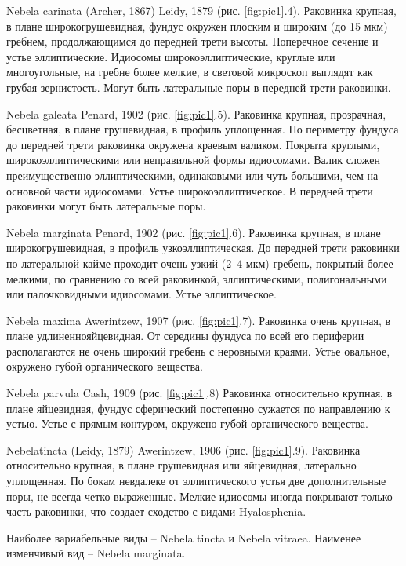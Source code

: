 \documentclass[12pt, a4paper]{article}
\begin{document}
Nebela carinata (Archer, 1867) Leidy, 1879 (рис. \ref{fig:pic1}.4). Раковинка крупная, в плане широкогрушевидная, фундус окружен плоским и широким (до 15 мкм) гребнем, продолжающимся до передней трети высоты. Поперечное сечение и устье эллиптические. Идиосомы широкоэллиптические, круглые или многоугольные, на гребне более мелкие, в световой микроскоп выглядят как грубая зернистость. Могут быть латеральные поры в передней трети раковинки. 

Nebela galeata Penard, 1902 (рис. \ref{fig:pic1}.5). Раковинка крупная, прозрачная, бесцветная, в плане грушевидная, в профиль уплощенная. По периметру фундуса до передней трети раковинка окружена краевым валиком. Покрыта круглыми, широкоэллиптическими или неправильной формы идиосомами. Валик сложен преимущественно эллиптическими, одинаковыми или чуть большими, чем на основной части идиосомами. Устье широкоэллиптическое. В передней трети раковинки могут быть латеральные поры.

Nebela marginata Penard, 1902 (рис. \ref{fig:pic1}.6). Раковинка крупная, в плане широкогрушевидная, в профиль узкоэллиптическая. До передней трети раковинки по латеральной кайме проходит очень узкий (2–4 мкм) гребень, покрытый более мелкими, по сравнению со всей раковинкой, эллиптическими, полигональными или палочковидными идиосомами. Устье эллиптическое. 

Nebela maxima Awerintzew, 1907 (рис. \ref{fig:pic1}.7). Раковинка очень крупная, в плане удлиненнояйцевидная. От середины фундуса по всей его периферии располагаются не очень широкий гребень с неровными краями. Устье овальное, окружено губой органического вещества.

Nebela parvula Cash, 1909  (рис. \ref{fig:pic1}.8) Раковинка относительно крупная, в плане яйцевидная, фундус сферический постепенно сужается по направлению к устью. Устье с прямым контуром, окружено губой органического вещества.

Nebelatincta (Leidy, 1879) Awerintzew, 1906 (рис. \ref{fig:pic1}.9). Раковинка относительно крупная, в плане грушевидная или яйцевидная, латерально уплощенная. По бокам невдалеке от эллиптического устья две дополнительные поры, не всегда четко выраженные. Мелкие идиосомы иногда покрывают только часть раковинки, что создает сходство с видами Hyalosphenia.

Наиболее вариабельные виды – Nebela tincta и Nebela vitraea. Наименее изменчивый вид – Nebela
marginata.
\end{document}
